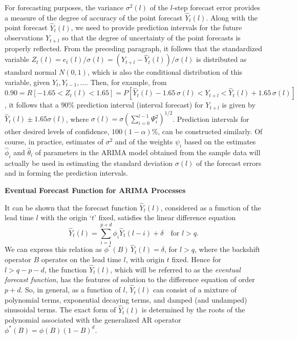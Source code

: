 For forecasting purposes, the variance $\sigma^2(l)$ of the $l$-step forecast error provides a measure of the degree of accuracy of the point forecast $\hat{Y}_t(l)$. Along with the point forecast $\hat{Y}_t(l)$, we need to provide prediction intervals for the future observations $Y_{t+l}$ so that the degree of uncertainty of the point forecasts is properly reflected. From the preceding paragraph, it follows that the standardized variable $Z_t(l) = e_t(l) / \sigma(l)= ( Y_{t+l} - \hat{Y}_t(l) ) / \sigma(l)$ is distributed as standard normal $N(0,1)$, which is also the conditional distribution of this variable, given $Y_t, Y_{t-1}, \ldots$. Then, for example, from $0.90 = R[-1.65 < Z_t(l) < 1.65] = P[\hat{Y}_t(l) - 1.65\,\sigma(l) < Y_{t+l} < \hat{Y}_t(l) + 1.65\,\sigma(l)]$, it follows that a $90\%$ prediction interval (interval forecast) for $Y_{t+l}$ is given by $\hat{Y}_t(l) \pm 1.65 \sigma(l)$, where $\sigma(l) = \sigma( \sum_{i=0}^{l-1} \Psi_i^2 )^{1/2}$. Prediction intervals for other desired levels of confidence, $100(1 - \alpha)\%$, can be constructed similarly. Of course, in practice, estimates of $\sigma^2$ and of the weights $\psi_i$ based on the estimates $\hat{\phi}_i$ and $\hat{\theta}_i$ of parameters in the ARIMA model obtained from the sample data will actually be used in estimating the standard deviation $\sigma(l)$ of the forecast errors and in forming the prediction intervals. \twomedskip


\noindent\textbf{Eventual Forecast Function for ARIMA Processes} \twomedskip


It can be shown that the forecast function $\hat{Y}_t(l)$, considered as a function of the lead time $l$ with the origin `$t$' fixed, satisfies the linear difference equation
	\begin{equation} \label{eqn:2twoyhat}
	\hat{Y}_t(l) = \sum_{i=1}^{p+d}  \phi_i \hat{Y}_t(l-i) + \delta \quad \text{for } l > q.
	\end{equation}
We can express this relation as $\phi^*(B)\, \hat{Y}_t(l) = \delta$, for $l > q$, where the backshift operator $B$ operates on the lead time $l$, with origin $t$ fixed. Hence for $l > q - p - d$, the function $\hat{Y}_t(l)$, which will be referred to as the \emph{eventual forecast function}, has the features of solution to the difference equation of order $p + d$. So, in general, as a function of $l$, $\hat{Y}_t(l)$ can consist of a mixture of polynomial terms, exponential decaying terms, and damped (and undamped) sinusoidal terms. The exact form of $\hat{Y}_t(l)$ is determined by the roots of the polynomial associated with the generalized AR operator $\phi^*(B) = \phi(B)(1 - B)^d$. 


